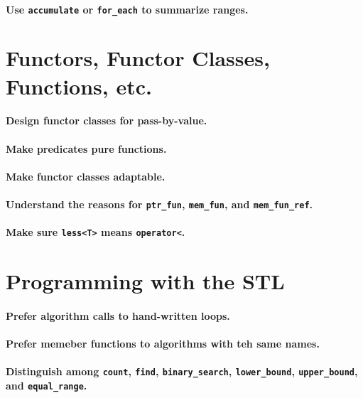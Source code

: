 \documentclass{article}
\begin{document}
\paragraph{Use {\tt accumulate} or {\tt for\_each} to summarize ranges.}

\section{Functors, Functor Classes, Functions, etc.}

\paragraph{Design functor classes for pass-by-value.}
\paragraph{Make predicates pure functions.}
\paragraph{Make functor classes adaptable.}
\paragraph{Understand the reasons for {\tt ptr\_fun}, {\tt mem\_fun}, and {\tt mem\_fun\_ref}.}
\paragraph{Make sure {\tt less<T>} means {\tt operator<}.}

\section{Programming with the STL}

\paragraph{Prefer algorithm calls to hand-written loops.}
\paragraph{Prefer memeber functions to algorithms with teh same names.}
\paragraph{Distinguish among {\tt count}, {\tt find}, {\tt binary\_search}, {\tt lower\_bound}, {\tt upper\_bound}, and {\tt equal\_range}.}
\end{document}
